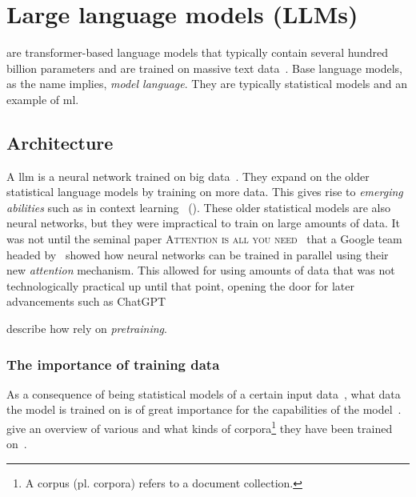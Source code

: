 \section{Large language models (LLMs)}

 are transformer-based language models that typically contain several hundred billion
parameters and are trained on massive text data~\cite[4]{llmSurvey}.
Base language models, as the name implies, \textit{model language}. They are typically statistical
models and an example of \acrfull{ml}.

\subsection{Architecture}\label{sec:llmArch}

A \acrlong{llm} is a neural network trained on big data~\cite[3]{llmSurvey}. They expand on the
older statistical language models by training on more data. This gives rise to \textit{emerging
    abilities} such as in context learning~\cite[3]{llmSurvey} (). These
older statistical models are also neural networks, but they were impractical to train on large
amounts of data. It was not until the seminal paper \textsc{Attention is all you
    need}~\cite{attentionIsAllYouNeed} that a Google team headed by~\citeauthor{attentionIsAllYouNeed}
showed how neural networks can be trained in parallel using their new \textit{attention} mechanism.
This allowed for using amounts of data that was not technologically practical up until that point,
opening the door for later advancements such as
ChatGPT~\cite[9]{llmSurvey}

\citeauthor{jm} describe how  rely on \textit{pretraining}.

\subsubsection{The importance of training data}

As a consequence of  being statistical models of a certain input
data~\cite[1]{llmSurvey}, what data the model is trained on is of great
importance for the capabilities of the model~\cite[6]{llmSurvey}.
\citeauthor{llmSurvey} give an overview of various  and what
kinds of corpora\footnote{A corpus (pl. corpora) refers to a document
    collection.} they have been trained on~\cite[11-14]{llmSurvey}.

